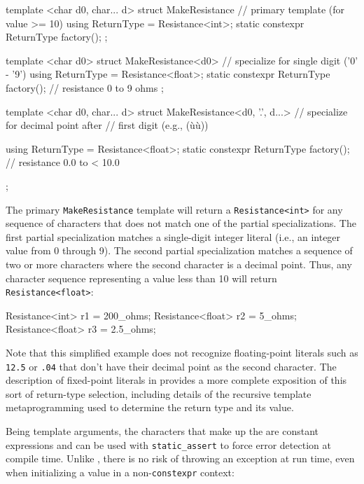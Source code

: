 \begin{emcppslisting}[emcppsbatch=e12]
template <char d0, char... d>
struct MakeResistance
{
    // primary template (for value >= 10)
    using ReturnType = Resistance<int>;
    static constexpr ReturnType factory();
};

template <char d0>
struct MakeResistance<d0>
{
    // specialize for single digit ('0' - '9')
    using ReturnType = Resistance<float>;
    static constexpr ReturnType factory(); // resistance 0 to 9 ohms
};

template <char d0, char... d>
struct MakeResistance<d0, '.', d...>  // specialize for decimal point after
                                      // first digit (e.g., (ù{}ù))
{
    
    using ReturnType = Resistance<float>;
    static constexpr ReturnType factory(); // resistance 0.0 to < 10.0
};
\end{emcppslisting}
    
\noindent The primary \lstinline!MakeResistance! template will return a
\lstinline!Resistance<int>! for any sequence of characters that does not
match one of the partial specializations. The first partial
specialization matches a single-digit integer literal (i.e., an integer
value from 0 through 9). The second partial specialization matches a
sequence of two or more characters where the second character is a
decimal point. Thus, any character sequence representing a value less
than 10 will return \lstinline!Resistance<float>!:

\begin{emcppslisting}[emcppsbatch=e12]
Resistance<int>   r1 = 200_ohms;
Resistance<float> r2 = 5_ohms;
Resistance<float> r3 = 2.5_ohms;
\end{emcppslisting}
    
\noindent Note that this simplified example does not recognize floating-point
literals such as \lstinline!12.5! or \lstinline!.04! that don't have their
decimal point as the second character. The description of fixed-point
literals in  provides a more complete exposition of this sort
of return-type selection, including details of the recursive template
metaprogramming used to determine the return type and its value.

Being template arguments, the characters that make up the  are constant expressions and can be used with
\lstinline!static_assert! to force error detection at compile time. Unlike
, there is no risk of throwing an exception at
run time, even when initializing a value in a non-\lstinline!constexpr!
context:

